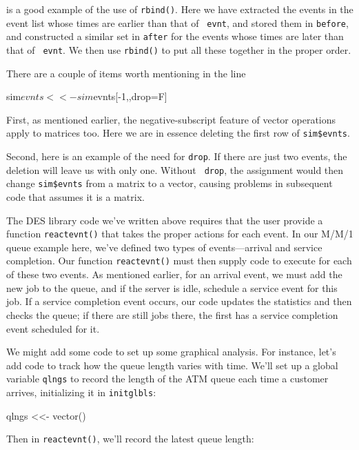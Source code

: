 is a good example of the use of {\tt rbind()}.  Here we have extracted
the events in the event list whose times are earlier than that of {\tt
evnt}, and stored them in {\tt before}, and constructed a similar set in
{\tt after} for the events whose times are later than that of {\tt
evnt}.  We then use {\tt rbind()} to put all these together in the
proper order.

There are a couple of items worth mentioning in the line

\begin{Code}
sim$evnts <<- sim$evnts[-1,,drop=F]
\end{Code}

First, as mentioned earlier, the negative-subscript feature of vector
operations apply to matrices too.  Here we are in essence deleting the
first row of {\tt sim\$evnts}.

Second, here is an example of the need for {\tt drop}.  If there are
just two events, the deletion will leave us with only one.  Without {\tt
drop}, the assignment would then change {\tt sim\$evnts} from a matrix
to a vector, causing problems in subsequent code that assumes it is a
matrix.

The DES library code we've written above requires that the user provide
a function {\tt reactevnt()} that takes the proper actions for each
event.  In our M/M/1 queue example here, we've defined two types of
events---arrival and service completion.  Our function {\tt reactevnt()}
must then supply code to execute for each of these two events.  As
mentioned earlier, for an arrival event, we must add the new job to the
queue, and if the server is idle, schedule a service event for this job.
If a service completion event occurs, our code updates the statistics
and then checks the queue; if there are still jobs there, the first has
a service completion event scheduled for it.  

We might add some code to set up some graphical analysis.  For instance,
let's add code to track how the queue length varies with time.  We'll
set up a global variable {\tt qlngs} to record the length of the ATM
queue each time a customer arrives, initializing it in {\tt initglbls}:

\begin{Code}
qlngs <<- vector()
\end{Code}

\noindent 
Then in {\tt reactevnt()}, we'll record the latest queue length:

\begin{Code}
if (head[2] == arvtype) {  # arrival
   qlngs <<- c(qlngs,length(srvq))
\end{Code}

